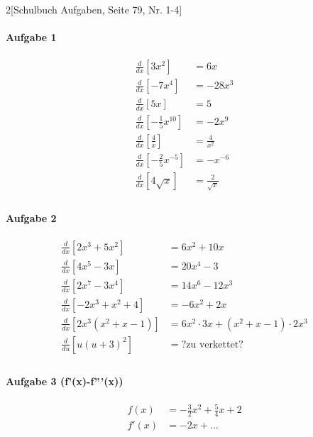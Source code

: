 \documentclass{book}
\begin{document}
\begin{multicols}{2}[Schulbuch Aufgaben, Seite 79, Nr. 1-4]
\paragraph{Aufgabe 1} %
\label{par:Aufgabe 1}
\begin{align*}
\frac{d}{dx}\left[3x^2\right]&=6x\\
\frac{d}{dx}\left[-7x^4\right]&=-28x^3\\
\frac{d}{dx}\left[5x\right]&=5\\
\frac{d}{dx}\left[-\frac{1}{5}x^{10}\right]&=-2x^9\\
\frac{d}{dx}\left[\frac{4}{x}\right]&=\frac{4}{x^2}\\
\frac{d}{dx}\left[-\frac{2}{5}x^{-5}\right]&=-x^{-6}\\
\frac{d}{dx}\left[4\sqrt{x}\right]&=\frac{2}{\sqrt{x}}\\
\end{align*}

\paragraph{Aufgabe 2} %
\label{par:Aufgabe 2}
\begin{align*}
\frac{d}{dx}\left[2x^3+5x^2\right]&=6x^2+10x\\
\frac{d}{dx}\left[4x^5-3x\right]&=20x^4-3\\
\frac{d}{dx}\left[2x^7-3x^4\right]&=14x^6-12x^3\\
\frac{d}{dx}\left[-2x^3+x^2+4\right]&=-6x^2+2x\\
\frac{d}{dx}\left[2x^3(x^2+x-1)\right]&=6x^2 \cdot 3x + (x^2+x-1) \cdot 2x^3\\
\frac{d}{du}\left[u(u+3)^2\right]&=?\text{zu verkettet}?\\
\end{align*}

\paragraph{Aufgabe 3 (f'(x)-f'''(x))} %
\label{par:Aufgabe 3}
\begin{align*}
f(x)&=-\frac{3}{2}x^2+\frac{5}{4}x+2\\
f'(x)&=-2x+...\\
\end{align*}


\end{multicols}
\end{document}
